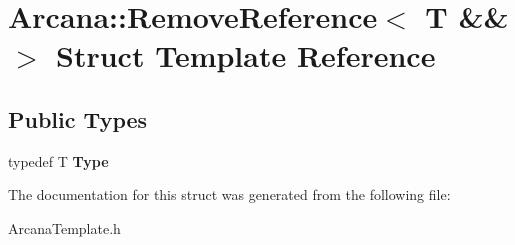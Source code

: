 \hypertarget{struct_arcana_1_1_remove_reference_3_01_t_01_6_6_01_4}{}\section{Arcana\+:\+:Remove\+Reference$<$ T \&\& $>$ Struct Template Reference}
\label{struct_arcana_1_1_remove_reference_3_01_t_01_6_6_01_4}
\subsection*{Public Types}
\begin{DoxyCompactItemize}
\item 
\mbox{\label{struct_arcana_1_1_remove_reference_3_01_t_01_6_6_01_4_a5725b23062432b709ad14906725d3f79}} 
typedef T {\bfseries Type}
\end{DoxyCompactItemize}


The documentation for this struct was generated from the following file\+:\begin{DoxyCompactItemize}
\item 
Arcana\+Template.\+h\end{DoxyCompactItemize}

